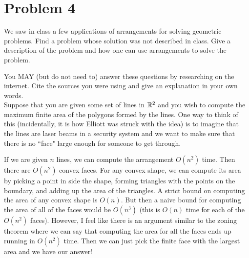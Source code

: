 \documentclass[11pt]{article}
\begin{document}
\newpage
\section*{Problem 4}

We saw in class a few applications of arrangements for solving geometric
problems. Find a problem whose solution was not described in class.  Give a
description of the problem and how one can use arrangements to solve the
problem.

You MAY (but do not need to) answer these questions by researching on the
internet. Cite the sources you were using and give an explanation in your own
words. \\

\answer
Suppose that you are given some set of lines in $\mathbb{R} ^2$ and you wish to compute the maximum finite area of the polygons formed by the lines.
One way to think of this (incidentally, it is how Elliott was struck with the idea) is to imagine that the lines are laser beams in a security system and we want to make sure that there is no ``face" large enough for someone to get through.

If we are given $n$ lines, we can compute the arrangement $O(n^2)$ time.
Then there are $O(n^2)$ convex faces.
For any convex shape, we can compute its area by picking a point in side the shape, forming triangles with the points on the boundary, and adding up the area of the triangles.
A strict bound on computing the area of any convex shape is $O(n)$.
But then a naive bound for computing the area of all of the faces would be $O(n^3)$ (this is $O(n)$ time for each of the $O(n^2)$ faces).
However, I feel like there is an argument similar to the zoning theorem where we can say that computing the area for all the faces ends up running in $O(n^2)$ time.
Then we can just pick the finite face with the largest area and we have our answer!
\end{document}
